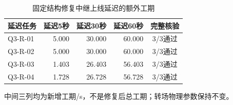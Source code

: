 \begin{table}[htbp]\centering\small
\caption{固定结构修复中继上线延迟的额外工期}\label{tab:q3_repair}
\begin{tabular}{@{}lrrrc@{}}
\toprule
延迟任务 & 延迟5秒 & 延迟30秒 & 延迟60秒 & 完整核验\\
\midrule
Q3-R-01 & 5.000 & 30.000 & 60.000 & 3/3通过\\
Q3-R-02 & 5.000 & 30.000 & 60.000 & 3/3通过\\
Q3-R-03 & 1.403 & 26.403 & 56.403 & 3/3通过\\
Q3-R-04 & 1.728 & 26.728 & 56.728 & 3/3通过\\
\bottomrule
\end{tabular}
\par\smallskip\parbox{.96\linewidth}{\footnotesize 中间三列均为新增工期/s，不是修复后总工期；转场物理参数保持不变。}
\end{table}
